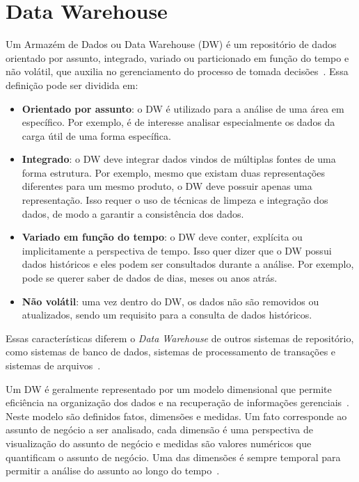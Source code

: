 \section{Data Warehouse}
\label{ch:fun:dw}

Um Armazém de Dados ou Data Warehouse (DW) é um repositório de dados orientado por assunto, integrado, variado ou particionado em função do tempo e não volátil, que auxilia no gerenciamento do processo de tomada decisões~\cite{inmonUsingDataWarehouse1994}.
Essa definição pode ser dividida em:

\begin{itemize}
	\item \textbf{Orientado por assunto}: o DW é utilizado para a análise de uma área em específico.
Por exemplo, é de interesse analisar especialmente os dados da carga útil de uma forma específica.
	\item \textbf{Integrado}: o DW deve integrar dados vindos de múltiplas fontes de uma forma estrutura.
Por exemplo, mesmo que existam duas representações diferentes para um mesmo produto, o DW deve possuir apenas uma representação.
Isso requer o uso de técnicas de limpeza e integração dos dados, de modo a garantir a consistência dos dados.
	\item \textbf{Variado em função do tempo}: o DW deve conter, explícita ou implicitamente a perspectiva de tempo.
Isso quer dizer que o DW possui dados históricos e eles podem ser consultados durante a análise.
Por exemplo, pode se querer saber de dados de dias, meses ou anos atrás.
	\item \textbf{Não volátil}: uma vez dentro do DW, os dados não são removidos ou atualizados, sendo um requisito para a consulta de dados históricos.
\end{itemize}

Essas características diferem o \textit{Data Warehouse} de outros sistemas de repositório, como sistemas de banco de dados, sistemas de processamento de transações e sistemas de arquivos~\cite{hanDataMiningConcepts2011}.

Um DW é geralmente representado por um modelo dimensional que permite eficiência na organização dos dados e na recuperação de informações gerenciais~\cite{kimballDataWarehouseToolkit2013}.
Neste modelo são definidos fatos, dimensões e medidas.
Um fato corresponde ao assunto de negócio a ser analisado, cada dimensão é uma perspectiva de visualização do assunto de negócio e medidas são valores numéricos que quantificam o assunto de negócio.
Uma das dimensões é sempre temporal para permitir a análise do assunto ao longo do tempo~\cite{silva:2015:abordagensParaCubo}.

